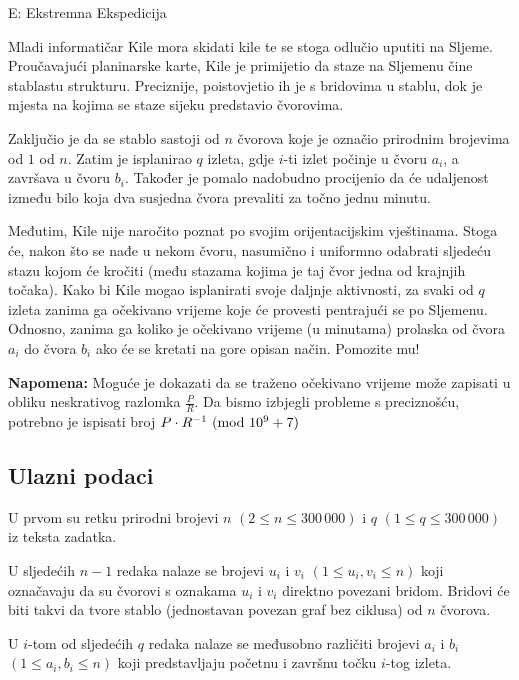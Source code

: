 \begin{statement}[
  timelimit=1 s,
  memorylimit=512 MiB,
]{E: Ekstremna Ekspedicija}

Mladi informatičar Kile mora skidati kile te se stoga odlučio uputiti na
Sljeme.  Proučavajući planinarske karte, Kile je primijetio da staze na
Sljemenu čine stablastu strukturu. Preciznije, poistovjetio ih je s bridovima u
stablu, dok je mjesta na kojima se staze sijeku predstavio čvorovima.

Zaključio je da se stablo sastoji od $n$ čvorova koje je označio prirodnim
brojevima od $1$ od $n$. Zatim je isplanirao $q$ izleta, gdje $i$-ti izlet
počinje u čvoru $a_i$, a završava u čvoru $b_i$. Također je pomalo nadobudno
procijenio da će udaljenost između bilo koja dva susjedna čvora prevaliti
za točno jednu minutu.

Međutim, Kile nije naročito poznat po svojim orijentacijskim vještinama. Stoga
će, nakon što se nađe u nekom čvoru, nasumično i uniformno odabrati sljedeću
stazu kojom će kročiti (među stazama kojima je taj čvor jedna od krajnjih
točaka). Kako bi Kile mogao isplanirati svoje daljnje aktivnosti, za svaki od
$q$ izleta zanima ga očekivano vrijeme koje će provesti pentrajući se po
Sljemenu. Odnosno, zanima ga koliko je očekivano vrijeme (u minutama)
prolaska od čvora $a_i$ do čvora $b_i$ ako će se kretati na gore opisan
način. Pomozite mu!

\textbf{Napomena:} Moguće je dokazati da se traženo očekivano vrijeme može
zapisati u obliku neskrativog razlomka $\frac{P}{R}$. Da bismo izbjegli
probleme s preciznošću, potrebno je ispisati broj $P \cdot R^{-1}
\ (\mathrm{mod}\ 10^9+7)$

\subsection*{Ulazni podaci}
U prvom su retku prirodni brojevi $n$ $(2 \le n \le 300\,000)$ i $q$ $(1 \le
q \le 300\,000)$ iz teksta zadatka.

U sljedećih $n-1$ redaka nalaze se brojevi $u_i$ i $v_i$ $(1 \le u_i, v_i \le
n)$ koji označavaju da su čvorovi s oznakama $u_i$ i $v_i$ direktno povezani
bridom.  Bridovi će biti takvi da tvore stablo (jednostavan povezan graf bez
ciklusa) od $n$ čvorova.

U $i$-tom od sljedećih $q$ redaka nalaze se međusobno različiti brojevi $a_i$ i
$b_i$ $(1 \le a_i, b_i \le n)$ koji predstavljaju početnu i završnu
točku $i$-tog izleta.


\end{statement}
